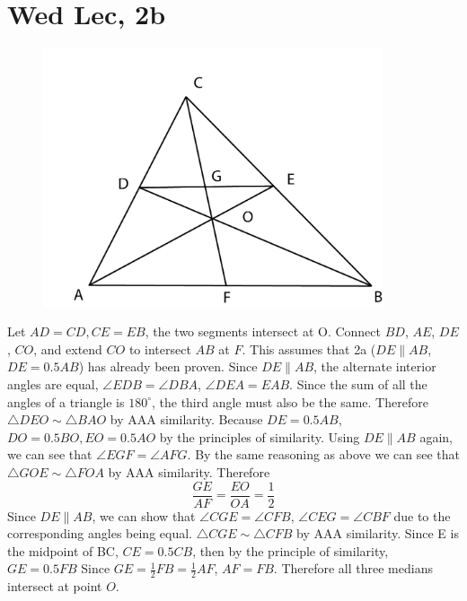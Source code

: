 \documentclass[12pt]{article}
\newcommand{\degrees}{^{\circ}}
\begin{document}
\section{Wed Lec, 2b}
\begin{figure}[h]
    \includegraphics[width = 100mm]{GRAPH3.png}
\end{figure}
Let $AD = CD, CE = EB$, the two segments intersect at O. Connect $BD$, $AE$, $DE$, $CO$, and extend $CO$ to intersect $AB$ at $F$.
\newline
This assumes that 2a ($DE \parallel AB$, $DE = 0.5AB$) has already been proven.
\newline
Since $DE \parallel AB$, the alternate interior angles are equal, $\angle EDB = \angle DBA$, $\angle DEA = EAB$. Since the sum of all the angles of a triangle is $180 \degrees$, the third angle must also be the same. Therefore $\triangle DEO \sim \triangle BAO$ by AAA similarity.
\newline
Because $DE = 0.5AB$, $DO = 0.5BO, EO = 0.5 AO$ by the principles of similarity.
\newline
Using $DE \parallel AB$ again, we can see that $\angle EGF = \angle AFG$. By the same reasoning as above we can see that $\triangle GOE \sim \triangle FOA$ by AAA similarity. Therefore $$\frac{GE}{AF} = \frac{EO}{OA} = \frac{1}{2}$$
Since $DE \parallel AB$, we can show that $\angle CGE = \angle CFB$, $\angle CEG = \angle CBF$ due to the corresponding angles being equal. $\triangle CGE \sim \triangle CFB$ by AAA similarity. Since E is the midpoint of BC, $CE = 0.5 CB$, then by the principle of similarity, $GE = 0.5FB$
\newline
Since $GE = \frac{1}{2}FB = \frac{1}{2}AF$, $AF = FB$. Therefore all three medians intersect at point $O$.
\newpage
\end{document}
